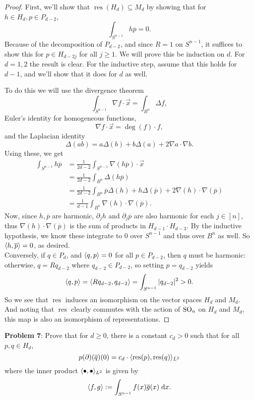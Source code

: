 \documentclass{amsart}
\DeclareMathOperator{\res}{res}
\begin{document}
	\begin{proof}
		First, we'll show that $\res(H_d)\subseteq M_d$ by showing that for $h\in H_d,p\in P_{d-2}$, 
		$$
		\int_{S^{n-1}} h\overline{p} = 0.
		$$
		Because of the decomposition of $P_{d-2}$, and since $R=1$ on $S^{n-1}$, it suffices to show this for $p\in H_{d-2j}$ for all $j\geq 1$. We will prove this be induction on $d$. For $d=1,2$ the result is clear. For the inductive step, assume that this holds for $d-1$, and we'll show that it does for $d$ as well.
		
		To do this we will use the divergence theorem
		$$
		\int_{S^{n-1}} \nabla f \cdot \vec{x} = \int_{B^{n}} \Delta f,
		$$
		Euler's identity for homogeneous functions,
		$$
		\nabla f \cdot \vec{x} = \deg(f) \cdot f,
		$$
		and the Laplacian identity
		$$
		\Delta(ab) = a\Delta(b) + b\Delta(a) + 2\nabla a \cdot \nabla b.
		$$
		Using these, we get
		\begin{align*}
		\int_{S^{n-1}} h\overline{p} &= \frac{1}{2d-2} \int_{S^{n-1}} \nabla (h\overline{p}) \cdot \vec{x}\\
		&= \frac{1}{2d-2} \int_{B^{n}} \Delta (h\overline{p})\\
		&= \frac{1}{2d-2} \int_{B^{n}} \overline{p}\Delta (h) + h \Delta(\overline{p}) + 2\nabla(h)\cdot \nabla (\overline{p})\\
		&= \frac{1}{d-1}\int_{B^{n}} \nabla(h)\cdot \nabla (\overline{p}).
		\end{align*}
		Now, since $h,\overline{p}$ are harmonic, $\partial_j h$ and $\partial_j \overline{p}$ are also harmonic for each $j\in [n]$, thus $\nabla(h)\cdot \nabla(\overline{p})$ is the sum of products in $H_{d-1}\cdot H_{d-3}$. By the inductive hypothesis, we know these integrate to $0$ over $S^{n-1}$ and thus over $B^n$ as well. So $\langle h,\overline{p}\rangle=0$, as desired.\\
		
		Conversely, if $q\in P_d$, and $\langle q,p\rangle=0$ for all $p\in P_{d-2}$, then $q$ must be harmonic: otherwise, $q=Rq_{d-2}$ where $q_{d-2}\in P_{d-2}$, so setting $p=q_{d-2}$ yields
		$$
		\langle q,p\rangle = \langle Rq_{d-2},q_{d-2}\rangle = \int_{S^{n-1}} |q_{d-2}|^2 > 0.
		$$
		So we see that $\res$ induces an isomorphism on the vector spaces $H_d$ and $M_d$. And noting that $\res$ clearly commutes with the action of $\operatorname{SO}_n$ on $H_d$ and $M_d$, this map is also an isomorphism of representations.
	\end{proof}
	
	\newpage 
	\noindent \textbf{Problem 7}: Prove that for $d\geq 0$, there is a constant $c_d>0$ such that for all $p,q\in H_d$, 
	$$p(\partial)(\overline{q})(0) = c_d \cdot \<\res(p),\res(q)\>_{L^2}$$
	where the inner product $\langle\bullet,\bullet\rangle_{L^2}$ is given by 
	$$
	\langle f,g\rangle := \int_{S^{n-1}} f(x)\overline{g}(x)
 \; \textrm{d} x.$$
 
\end{document}
